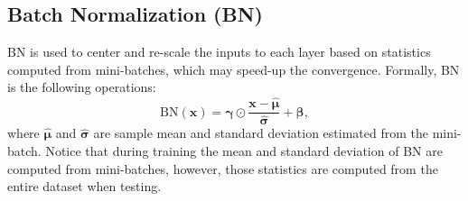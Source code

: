 \subsection{Batch Normalization (BN)}
    BN is used to center and re-scale the inputs to each layer based on statistics computed from mini-batches, which may speed-up the convergence.
    Formally, BN is the following operations:
        \begin{equation}
            \text{BN}(\bm{x}) = \bm{\gamma} \odot \frac{\bm{x} - \hat{\bm{\mu}} }{\hat{\bm{\sigma}}} + \bm{\beta},
        \end{equation}
    where $\hat{\bm{\mu}}$ and $\hat{\bm{\sigma}}$ are sample mean and standard deviation estimated from the mini-batch.
    Notice that during training the mean and standard deviation of BN are computed from mini-batches, however, those statistics are computed from the entire dataset when testing.
        
    